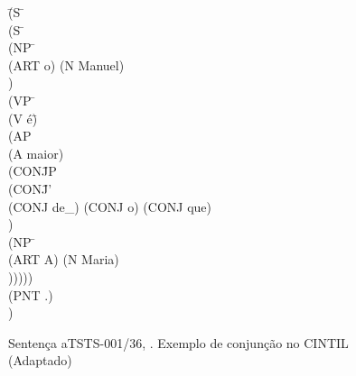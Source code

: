 \begin{figure}[!h]
    \centering
    \begin{minipage}{.8\textwidth}
        \begin{tabbing}
            \=(S  \=\+\\
            \>    (S  \=\+\\
            \>        (NP  \=\+\\
            \>            (ART o) (N Manuel)\-\\
            \>        )\\ 
            \>        (VP  \=\+\\
            \>            (V é\=) \\
            \>            (AP \+\\
            \>               (A maior) \\
            \>                (CON\=JP \+\\
            \>                    (CON\=J' \+\\
            \>                        (CONJ de\_) (CONJ o) (CONJ que)\-\\
            \>                    ) \\
            \>                    (NP \=\+\\
            \>                        (ART A) (N Maria)\-\\
            \>                    ))))) \-\-\-\-\\
            \>    (PNT .)\-\\
            \>)
        \end{tabbing}
    \end{minipage}
    \caption[Exemplo de conjunção no CINTIL]{Sentença aTSTS-001/36, . Exemplo de conjunção no CINTIL (Adaptado)}
    \label{fig:cintil_conj_exe_1}
\end{figure}